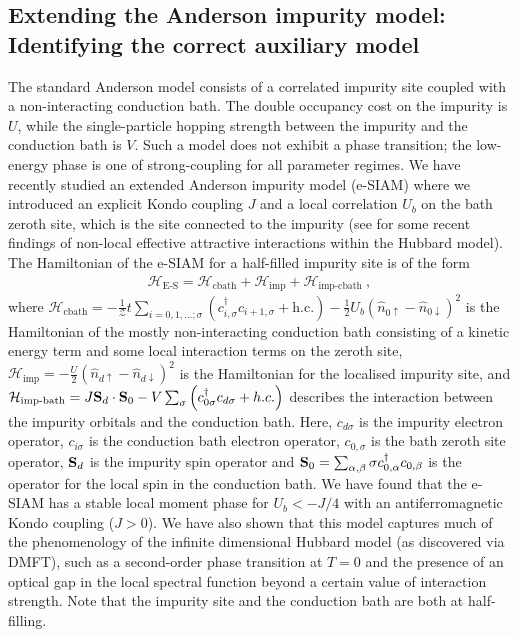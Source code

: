 \documentclass[reprint,hidelinks]{revtex4-2}
\begin{document}
\subsection{Extending the Anderson impurity model: Identifying the correct auxiliary model}
The standard Anderson model consists of a correlated impurity site coupled with a non-interacting conduction bath. The double occupancy cost on the impurity is \(U\), while the single-particle hopping strength between the impurity and the conduction bath is \(V\). Such a model does not exhibit a phase transition; the low-energy phase is one of strong-coupling for all parameter regimes. We have recently studied an extended Anderson impurity model (e-SIAM) where we introduced an explicit Kondo coupling \(J\) and a local correlation \(U_b\) on the bath zeroth site, which is the site connected to the impurity (see \cite{gazizovaleblanc2023} for some recent findings of non-local effective attractive interactions within the Hubbard model). The Hamiltonian of the e-SIAM for a half-filled impurity site is of the form
\begin{equation}\begin{aligned}
	\label{siam_attr}
	\mathcal{H}_\text{E-S} = \mathcal{H}_\text{cbath} + \mathcal{H}_\text{imp} + \mathcal{H}_\text{imp-cbath}~,
\end{aligned}\end{equation}
where \(\mathcal{H}_\text{cbath} = -\frac{1}{\mathcal{Z}}t\sum_{i=0,1,\ldots;\sigma}\left(c^\dagger_{i,\sigma}c_{i+1,\sigma} + \text{h.c.}\right) - \frac{1}{2}U_b\left(\hat n_{0 \uparrow} - \hat n_{0 \downarrow}\right)^2\) is the Hamiltonian of the mostly non-interacting conduction bath consisting of a kinetic energy term and some local interaction terms on the zeroth site, \(\mathcal{H}_\text{imp} = - \frac{U}{2}\left(\hat n_{d \uparrow} - \hat n_{d \downarrow} \right) ^2\) is the Hamiltonian for the localised impurity site, and \(\mathcal{H}_\text{imp-bath} = J {\bf S}_d\cdot{\bf S}_0 - V \sum_{\sigma} \left(c^\dagger_{0\sigma} c_{d\sigma} + h.c.\right)\) describes the interaction between the impurity orbitals and the conduction bath. Here, \(c_{d\sigma}\) is the impurity electron operator, \(c_{i\sigma}\) is the conduction bath electron operator, \(c_{0,\sigma}\) is the bath zeroth site operator, \({\bf S}_d\) is the impurity spin operator and \({\bf S}_0 = \sum_{\alpha,\beta}{\bf \sigma}c^\dagger_{0,\alpha}c_{0,\beta}\) is the operator for the local spin in the conduction bath. We have found that the e-SIAM has a stable local moment phase for \(U_b < -J/4\) with an antiferromagnetic Kondo coupling (\(J > 0\)). We have also shown that this model captures much of the phenomenology of the infinite dimensional Hubbard model (as discovered via DMFT), such as a second-order phase transition at \(T=0\) and the presence of an optical gap in the local spectral function beyond a certain value of interaction strength. Note that the impurity site and the conduction bath are both at half-filling.
\end{document}
